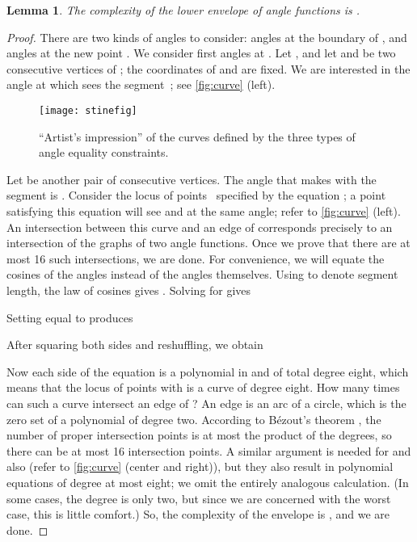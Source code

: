\documentclass{cccg13}
\newtheorem{lemma}{Lemma}
\begin{document}
\begin{lemma} The complexity of the lower envelope of  angle functions is
. \end{lemma}
\begin{proof} There are two kinds of angles to consider: angles at the boundary of , and angles at the new point .  We consider first angles at .  Let , and let  and  be two consecutive vertices of ; the coordinates of  and  are fixed.  We are interested in the angle  at which  sees the segment~; see \autoref{fig:curve} (left). 
\begin{figure}
  \centering
  \texttt{[image: stinefig]}
  \caption{``Artist's impression'' of the curves defined by the three types of angle equality constraints.}
  \label{fig:curve}
\end{figure}
Let  be another pair of consecutive vertices.  The angle that  makes with the segment  is .  Consider the locus of points~ specified by the equation
; a point~ satisfying this equation will see  and  at the same angle; refer to \autoref{fig:curve} (left).  An intersection between this curve and an edge of  corresponds precisely to an intersection of the graphs of two angle functions.  Once we prove that there are at most 16 such intersections, we are done.  For convenience, we will equate the cosines of the angles instead of the angles themselves.  Using  to denote segment length, the law of cosines gives
.  Solving for  gives

Setting  equal to  produces

After squaring both sides and reshuffling, we obtain

Now each side of the equation is a polynomial in  and  of total degree eight, which means that the locus of points  with  is a curve of degree eight.  How many times can such a curve intersect an edge of ?  An edge is an arc of a circle, which is the zero set of a polynomial of degree two.  According to B\'ezout's  theorem \cite{bez}, the number of proper intersection points is at most the product of the degrees, so there can be at most 16 intersection points.  A similar argument is needed for  and also  (refer to \autoref{fig:curve} (center and right)), but they also result in polynomial equations of degree at most eight; we omit the entirely analogous calculation.  (In some cases, the degree is only two, but since we are concerned with the worst case, this is little comfort.)  So, the complexity of the envelope is , and we are done.
\end{proof}
\end{document}

